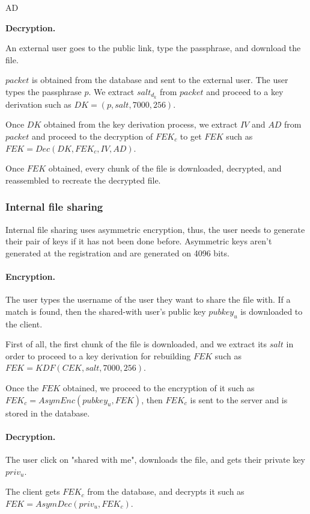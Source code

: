 AD\documentclass[a4paper,10pt]{article}
\begin{document}
\textbf{Decryption.}

An external user goes to the public link, type the passphrase, and download the file.

$packet$ is obtained from the database and sent to the external user. The user types the passphrase
$p$. We extract $salt_d_k$ from $packet$ and proceed to a key derivation such as $DK=(p, salt, 7000, 256)$.

Once $DK$ obtained from the key derivation process, we extract $IV$ and $AD$ from $packet$ and proceed to
the decryption of $FEK_c$ to get $FEK$ such as $FEK=Dec(DK, FEK_c, IV, AD)$.

Once $FEK$ obtained, every chunk of the file is downloaded, decrypted, and reassembled to recreate the
decrypted file.

\subsubsection{Internal file sharing}

Internal file sharing uses asymmetric encryption, thus, the user needs to generate their pair of
keys if it has not been done before. Asymmetric keys aren't generated at the registration and
are generated on 4096 bits.

\paragraph{Encryption.}

The user types the username of the user they want to share the file with. If a match is found, then the
shared-with user's public key $pubkey_u$ is downloaded to the client.

First of all, the first chunk of the file is downloaded, and we extract its $salt$ in order to proceed
to a key derivation for rebuilding $FEK$ such as $FEK=KDF(CEK, salt, 7000, 256)$.

Once the $FEK$ obtained, we proceed to the encryption of it such as $FEK_c=AsymEnc(pubkey_u, FEK)$, then
$FEK_c$ is sent to the server and is stored in the database.

\paragraph{Decryption.}

The user click on "shared with me", downloads the file, and gets their private key $priv_u$.

The client gets $FEK_c$ from the database, and decrypts it such as $FEK=AsymDec(priv_u, FEK_c)$.
\end{document}
